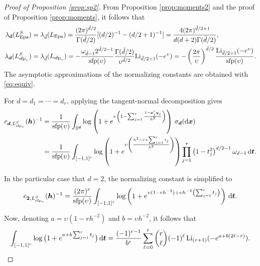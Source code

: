 \documentclass[oneside,11pt]{article}
\begin{document}
\begin{proof}[Proof of Proposition \ref{prop:sp2}]
From Proposition \ref{prop:moments2} and the proof of Proposition \ref{prop:moments}, it follows that
\begin{align*}
    \lambda_{\bd}(L_\mathrm{Epa}^S)&=\lambda_{\tilde{d}}(L_\mathrm{Epa})%
    =\frac{(2\pi)^{\tilde{d}/2}}{\Gamma(\tilde{d}/2)}[(d/2)^{-1}-(d/2+1)^{-1}]%
    =\frac{4(2\pi)^{\tilde{d}/2+1}}{d(d+2)\Gamma(\tilde{d}/2)},\\
    \lambda_{\bd}(L_{\mathrm{sfp}_\upsilon}^S)&=\lambda_{\tilde{d}}(L_{\mathrm{sfp}_\upsilon})=-\frac{\omega_{\tilde{d}-1}2^{\tilde{d}/2-1}}{\mathrm{sfp}(\upsilon)} \frac{\Gamma(\tilde{d}/2)}{\upsilon^{\tilde{d}/2}} \mathrm{Li}_{\tilde{d}/2+1}(-e^\upsilon)=-\left(\frac{2\pi}{\upsilon}\right)^{\tilde{d}/2} \frac{\mathrm{Li}_{\tilde{d}/2+1}(-e^\upsilon)}{\mathrm{sfp}(\upsilon)}.
\end{align*}
The asymptotic approximations of the normalizing constants are obtained with \eqref{eq:equiv}.

For $d=d_1=\cdots=d_r$, applying the tangent-normal decomposition gives
\begin{align*}
    c_{\boldsymbol{d},L_{\mathrm{sfp}_\upsilon}^{S}}({\boldsymbol{h}})^{-1}=&\;\frac{1}{\mathrm{sfp}(\upsilon)}\int_{\mathbb{S}^{\boldsymbol{d}}}\log\left(1+e^{\upsilon\left(1-\sum_{j=1}^r\frac{1-\boldsymbol{x}_j' \boldsymbol{y}_j}{h^2}\right)}\right) \,\sigma_{\boldsymbol{d}}(\mathrm{d}\boldsymbol{x})\\
    =&\;\frac{1}{\mathrm{sfp}(\upsilon)}\int_{[-1,1]^r}\log\left(1+e^{\upsilon\left(\frac{h^2-r+\sum_{j=1}^rt_j}{h^2}\right)}\right) \prod_{j=1}^r \left(1-t_j^2\right)^{d/2-1}\omega_{d-1}\,\mathrm{d} \boldsymbol{t}.
\end{align*}

In the particular case that $d=2$, the normalizing constant is simplified to
\begin{align*}
    c_{\mathbf{2},L_{\mathrm{sfp}_\upsilon}^{S}}({\boldsymbol{h}})^{-1}
    =\frac{(2\pi)^r}{\mathrm{sfp}(\upsilon)}\int_{[-1,1]^r}\log\left(1+e^{\upsilon(1-rh^{-2})+\upsilon h^{-2}\left(\sum_{j=1}^rt_j\right)}\right) \,\mathrm{d} \boldsymbol{t}.
\end{align*}

Now, denoting $a=\upsilon(1-rh^{-2})$ and $b=\upsilon h^{-2}$, it follows that
\begin{align}\label{eq:polylog}
    \int_{[-1,1]^r} \log \big(1+e^{a+b \sum_{j=1}^rt_j}\big) \,\mathrm{d} \boldsymbol{t}
    =\frac{(-1)^{r-1}}{b^r}\sum_{\ell=0}^{r}\binom{r}{\ell} (-1)^\ell\, \mathrm{Li}_{(r+1)}(-e^{a+b(2\ell-r)}).
\end{align}


\end{proof}
\end{document}
